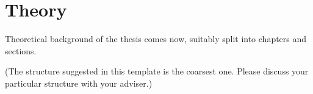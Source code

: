\chapter{Theory}

Theoretical background of the thesis comes now, suitably split into chapters and sections.

(The structure suggested in this template is the coarsest one.
Please discuss your particular structure with your adviser.)
